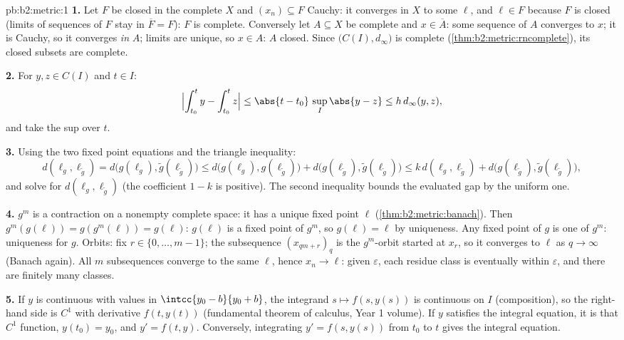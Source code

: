 \begin{solution}{pb:b2:metric:1}
\textbf{1.} Let $F$ be closed in the complete $X$ and $(x_n)
\subseteq F$ Cauchy: it converges in $X$ to some $\ell$, and
$\ell \in F$ because $F$ is closed (limits of sequences of $F$
stay in $\overline F = F$): $F$ is complete. Conversely let $A
\subseteq X$ be complete and $x \in \overline A$: some sequence
of $A$ converges to $x$; it is Cauchy, so it converges \emph{in}
$A$; limits are unique, so $x \in A$: $A$ closed. Since
$\bigl(C(I), d_\infty\bigr)$ is complete
(\cref{thm:b2:metric:rncomplete}), its closed subsets are
complete.

\textbf{2.} For $y, z \in C(I)$ and $t \in I$:
\[
\Bigl|\int_{t_0}^{t}y - \int_{t_0}^{t}z\Bigr| \leq
\abs{t - t_0}\,\sup_I\abs{y - z} \leq h\,d_\infty(y, z),
\]
and take the sup over $t$.

\textbf{3.} Using the two fixed point equations and the triangle
inequality:
\[
d(\ell_g, \ell_{\widetilde g})
= d\bigl(g(\ell_g), \widetilde g(\ell_{\widetilde g})\bigr)
\leq d\bigl(g(\ell_g), g(\ell_{\widetilde g})\bigr) +
d\bigl(g(\ell_{\widetilde g}), \widetilde g(\ell_{\widetilde
g})\bigr)
\leq k\,d(\ell_g, \ell_{\widetilde g}) +
d\bigl(g(\ell_{\widetilde g}), \widetilde g(\ell_{\widetilde
g})\bigr),
\]
and solve for $d(\ell_g, \ell_{\widetilde g})$ (the coefficient
$1 - k$ is positive). The second inequality bounds the evaluated
gap by the uniform one.

\textbf{4.} $g^m$ is a contraction on a nonempty complete space:
it has a unique fixed point $\ell$
(\cref{thm:b2:metric:banach}). Then $g^m(g(\ell)) =
g(g^m(\ell)) = g(\ell)$: $g(\ell)$ is a fixed point of $g^m$,
so $g(\ell) = \ell$ by uniqueness. Any fixed point of $g$ is one
of $g^m$: uniqueness for $g$. Orbits: fix $r \in \{0, \dots,
m-1\}$; the subsequence $(x_{qm + r})_q$ is the $g^m$-orbit
started at $x_r$, so it converges to $\ell$ as $q \to \infty$
(Banach again). All $m$ subsequences converge to the same
$\ell$, hence $x_n \to \ell$: given $\varepsilon$, each residue
class is eventually within $\varepsilon$, and there are finitely
many classes.

\textbf{5.} If $y$ is continuous with values in $\intcc{y_0 -
b}{y_0 + b}$, the integrand $s \mapsto f(s, y(s))$ is continuous
on $I$ (composition), so the right-hand side is $C^1$ with
derivative $f(t, y(t))$ (fundamental theorem of calculus, Year 1
volume). If $y$ satisfies the integral equation, it is that
$C^1$ function, $y(t_0) = y_0$, and $y' = f(t, y)$. Conversely,
integrating $y' = f(s, y(s))$ from $t_0$ to $t$ gives the
integral equation.


\end{solution}
